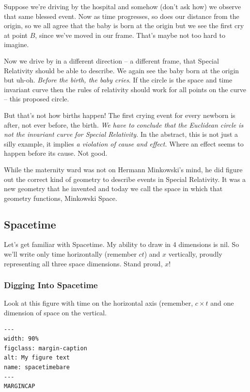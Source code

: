 \documentclass[
]{article}
\begin{document}
Suppose we're driving by the hospital and somehow (don't ask how) we
observe that same blessed event. Now as time progresses, so does our
distance from the origin, so we all agree that the baby is born at the
origin but we see the first cry at point \(B\), since we've moved in our
frame. That's maybe not too hard to imagine.

Now we drive by in a different direction -- a different frame, that
Special Relativity should be able to describe. We again see the baby
born at the origin but uh-oh. \emph{Before the birth, the baby cries}.
If the circle is the space and time invariant curve then the rules of
relativity should work for all points on the curve -- this proposed
circle.

But that's not how births happen! The first crying event for every
newborn is after, not ever before, the birth. \emph{We have to conclude
that the Euclidean circle is not the invariant curve for Special
Relativity.} In the abstract, this is not just a silly example, it
implies \emph{a violation of cause and effect.} Where an effect seems to
happen before its cause. Not good.

While the maternity ward was not on Hermann Minkowski's mind, he did
figure out the correct kind of geometry to describe events in Special
Relativity. It was a new geometry that he invented and today we call the
space in which that geometry functions, Minkowski Space.

\hypertarget{spacetime}{%
\subsection{Spacetime}\label{spacetime}}

Let's get familiar with Spacetime. My ability to draw in 4 dimensions is
nil. So we'll write only time horizontally (remember \(ct\)) and \(x\)
vertically, proudly representing all three space dimensions. Stand
proud, \(x\)!

\hypertarget{digging-into-spacetime}{%
\subsubsection{Digging Into Spacetime}\label{digging-into-spacetime}}

Look at this figure with time on the horizontal axis (remember,
\(c \times t\) and one dimension of space on the vertical.

\begin{verbatim}
---
width: 90%
figclass: margin-caption
alt: My figure text
name: spacetimebare
---
MARGINCAP
\end{verbatim}
\end{document}
